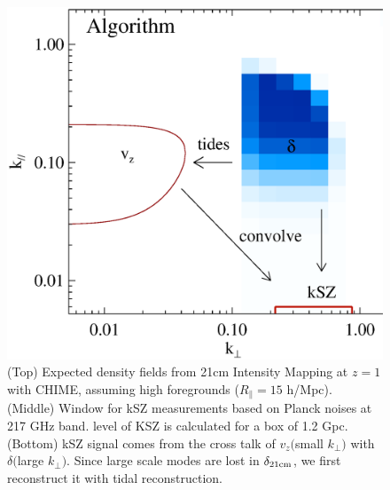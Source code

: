 \begin{figure}[tbp]
\begin{minipage}[t]{\linewidth}
\includegraphics[width=\textwidth]{figure/demo_convolution.eps}
\vspace{-0.6cm}
\end{minipage}
\caption{
    (Top) Expected density fields from    
    21cm Intensity Mapping at $z=1$ with  
    CHIME, assuming high foregrounds ($R_\parallel=15$ h/Mpc). 
    (Middle) Window for kSZ measurements based on Planck noises at 217 GHz band. level of KSZ is calculated for a box of 1.2 Gpc.
    (Bottom) %
    kSZ signal comes from the cross talk of 
     $v_z($small $k_\perp)$ with $\delta($large $k_\perp)$. 
    Since large scale modes are lost in $\delta_\mathrm{21cm}$, 
    we first reconstruct it with tidal reconstruction. 
}
\end{figure}
